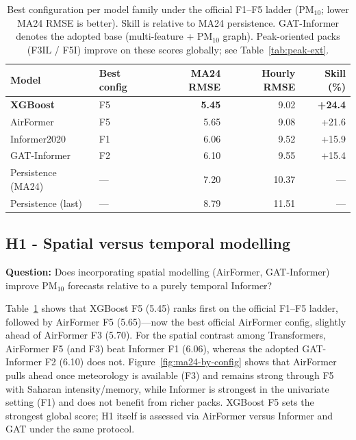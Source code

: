 \documentclass[11pt]{article}
\begin{document}
\begin{table}[ht]
\centering
\caption{Best configuration per model family under the official F1--F5 ladder (PM$_{10}$; lower MA24 RMSE is better). Skill is relative to MA24 persistence. GAT-Informer denotes the adopted base (multi-feature + PM$_{10}$ graph). Peak-oriented packs (F3IL / F5I) improve on these scores globally; see Table~\ref{tab:peak-ext}.}
\label{tab:results-best}
\small
\begin{tabular}{@{}llrrr@{}}
\toprule
Model & Best config & MA24 RMSE & Hourly RMSE & Skill (\%) \\
\midrule
\textbf{XGBoost} & F5 & \textbf{5.45} & 9.02 & \textbf{+24.4} \\
AirFormer & F5 & 5.65 & 9.08 & +21.6 \\
Informer2020 & F1 & 6.06 & 9.52 & +15.9 \\
GAT-Informer & F2 & 6.10 & 9.55 & +15.4 \\
Persistence (MA24) & --- & 7.20 & 10.37 & --- \\
Persistence (last) & --- & 8.79 & 11.51 & --- \\
\bottomrule
\end{tabular}
\end{table}

\subsection{H1 - Spatial versus temporal modelling}
\label{sec:results-h1}
\label{sec:results-spatial-map}

\textbf{Question:} Does incorporating spatial modelling (AirFormer, GAT-Informer) improve PM$_{10}$ forecasts relative to a purely temporal Informer?

Table~\ref{tab:results-best} shows that XGBoost F5 (5.45) ranks first on the official F1--F5 ladder, followed by AirFormer F5 (5.65)---now the best official AirFormer config, slightly ahead of AirFormer F3 (5.70). For the spatial contrast among Transformers, AirFormer F5 (and F3) beat Informer F1 (6.06), whereas the adopted GAT-Informer F2 (6.10) does not. Figure~\ref{fig:ma24-by-config} shows that AirFormer pulls ahead once meteorology is available (F3) and remains strong through F5 with Saharan intensity/memory, while Informer is strongest in the univariate setting (F1) and does not benefit from richer packs. XGBoost F5 sets the strongest global score; H1 itself is assessed via AirFormer versus Informer and GAT under the same protocol.
\end{document}
